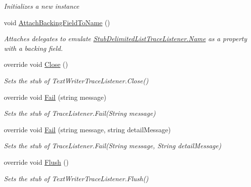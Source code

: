 \begin{DoxyCompactItemize}
\begin{DoxyCompactList}\small\item\em Initializes a new instance\end{DoxyCompactList}\item 
void \hyperlink{class_system_1_1_diagnostics_1_1_fakes_1_1_stub_delimited_list_trace_listener_afdaabe952ab0897f683181807ff0e5db}{Attach\-Backing\-Field\-To\-Name} ()
\begin{DoxyCompactList}\small\item\em Attaches delegates to emulate \hyperlink{class_system_1_1_diagnostics_1_1_fakes_1_1_stub_delimited_list_trace_listener_aa2ce31d8eb58b8dada6272e3fe936b0d}{Stub\-Delimited\-List\-Trace\-Listener.\-Name} as a property with a backing field.\end{DoxyCompactList}\item 
override void \hyperlink{class_system_1_1_diagnostics_1_1_fakes_1_1_stub_delimited_list_trace_listener_a0cdf7a3b5e5b86f1a56b0b64a95f8288}{Close} ()
\begin{DoxyCompactList}\small\item\em Sets the stub of Text\-Writer\-Trace\-Listener.\-Close()\end{DoxyCompactList}\item 
override void \hyperlink{class_system_1_1_diagnostics_1_1_fakes_1_1_stub_delimited_list_trace_listener_a76bc93aff92fb65b0d4227fe162609d6}{Fail} (string message)
\begin{DoxyCompactList}\small\item\em Sets the stub of Trace\-Listener.\-Fail(\-String message)\end{DoxyCompactList}\item 
override void \hyperlink{class_system_1_1_diagnostics_1_1_fakes_1_1_stub_delimited_list_trace_listener_aa49a8e67dd51444ed4559bcfd99b0085}{Fail} (string message, string detail\-Message)
\begin{DoxyCompactList}\small\item\em Sets the stub of Trace\-Listener.\-Fail(\-String message, String detail\-Message)\end{DoxyCompactList}\item 
override void \hyperlink{class_system_1_1_diagnostics_1_1_fakes_1_1_stub_delimited_list_trace_listener_a848a0afb41cd1ffe034ea79bd18fe308}{Flush} ()
\begin{DoxyCompactList}\small\item\em Sets the stub of Text\-Writer\-Trace\-Listener.\-Flush()\end{DoxyCompactList}\item 

\end{DoxyCompactItemize}
